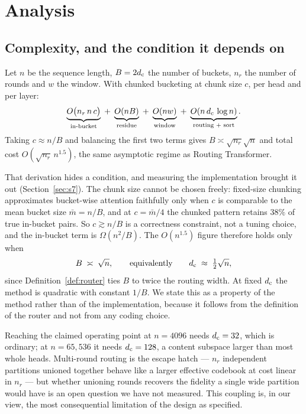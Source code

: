 \section{Analysis}
\label{sec:analysis}

\subsection{Complexity, and the condition it depends on}
\label{sec:complexity}

Let $n$ be the sequence length, $B = 2d_{\mathrm{c}}$ the number of buckets, $n_r$ the number of rounds and $w$ the window. With chunked bucketing at chunk size $c$, per head and per layer:
\begin{equation}
  \underbrace{O\big(n_r\, n\, c\big)}_{\text{in-bucket}} \;+\; \underbrace{O(nB)}_{\text{residue}} \;+\; \underbrace{O(nw)}_{\text{window}} \;+\; \underbrace{O(n\,d_{\mathrm{c}}\,\log n)}_{\text{routing + sort}}.
\end{equation}
Taking $c \approx n/B$ and balancing the first two terms gives $B \asymp \sqrt{n_r}\sqrt{n}$ and total cost $O(\sqrt{n_r}\,n^{1.5})$, the same asymptotic regime as Routing Transformer.

That derivation hides a condition, and measuring the implementation brought it out (Section~\ref{sec:s7}). The chunk size cannot be chosen freely: fixed-size chunking approximates bucket-wise attention faithfully only when $c$ is comparable to the mean bucket size $\bar{m} = n/B$, and at $c = \bar{m}/4$ the chunked pattern retains $38\%$ of true in-bucket pairs. So $c \gtrsim n/B$ is a correctness constraint, not a tuning choice, and the in-bucket term is $\Omega(n^2/B)$. The $O(n^{1.5})$ figure therefore holds only when
\begin{equation}
  B \;\asymp\; \sqrt{n}, \qquad\text{equivalently}\qquad d_{\mathrm{c}} \;\approx\; \tfrac{1}{2}\sqrt{n},
\end{equation}
since Definition~\ref{def:router} ties $B$ to twice the routing width. At fixed $d_{\mathrm{c}}$ the method is quadratic with constant $1/B$. We state this as a property of the method rather than of the implementation, because it follows from the definition of the router and not from any coding choice.

\begin{remark}
\label{rem:coupling}
Reaching the claimed operating point at $n = 4096$ needs $d_{\mathrm{c}} = 32$, which is ordinary; at $n = 65{,}536$ it needs $d_{\mathrm{c}} = 128$, a content subspace larger than most whole heads. Multi-round routing is the escape hatch --- $n_r$ independent partitions unioned together behave like a larger effective codebook at cost linear in $n_r$ --- but whether unioning rounds recovers the fidelity a single wide partition would have is an open question we have not measured. This coupling is, in our view, the most consequential limitation of the design as specified.
\end{remark}

